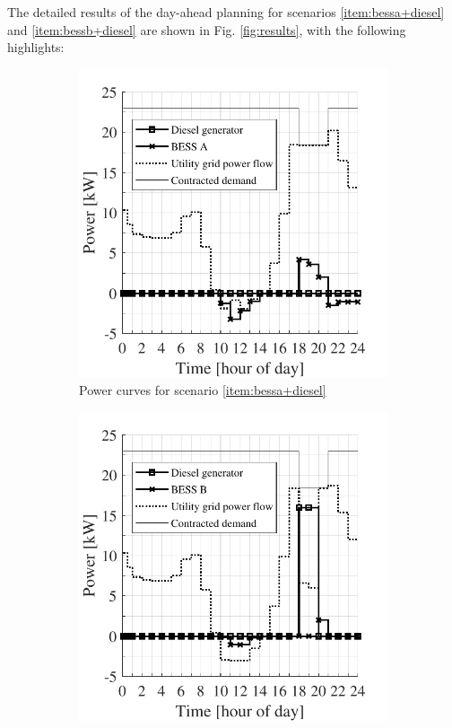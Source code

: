\documentclass{ieeeaccess}
\begin{document}
    The detailed results of the day-ahead planning for scenarios \ref{item:bessa+diesel} and \ref{item:bessb+diesel} are shown in Fig. \ref{fig:results}, with the following highlights:
    \begin{figure}[!h]
        \begin{subfigure}{.235\textwidth}
            \centering
            \includegraphics[width=\linewidth]{figures/residential_nv14_power.pdf}
            \caption{Power curves for scenario \ref{item:bessa+diesel}}
            \label{fig:result-power-A}
        \end{subfigure}
        \begin{subfigure}{.235\textwidth}
            \centering
            \includegraphics[width=\linewidth]{figures/residential_8ch33p_power.pdf}

\end{subfigure}
\end{figure}
\end{document}
